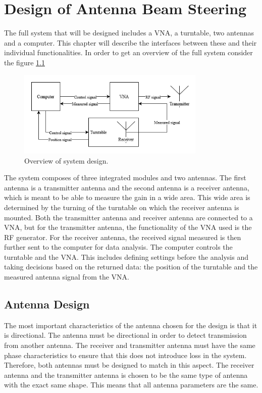 \chapter{Design of Antenna Beam Steering} \label{ch:design}
The full system that will be designed includes a VNA, a turntable, two antennas and a computer. This chapter will describe the interfaces between these and their individual functionalities. In order to get an overview of the full system consider the figure \ref{fig:system_design}
\begin{figure}[H]
    \centering
    \includegraphics[width=0.8\textwidth]{figures/system_design.png}
    \caption{Overview of system design.} \label{fig:system_design}
\end{figure}
The system composes of three integrated modules and two antennas. The first antenna is a transmitter antenna and the second antenna is a receiver antenna, which is meant to be able to measure the gain in a wide area. This wide area is determined by the turning of the turntable on which the receiver antenna is mounted. Both the transmitter antenna and receiver antenna are connected to a VNA, but for the transmitter antenna, the functionality of the VNA used is the RF generator. For the receiver antenna, the received signal measured is then further sent to the computer for data analysis. The computer controls the turntable and the VNA. This includes defining settings before the analysis and taking decisions based on the returned data: the position of the turntable and the measured antenna signal from the VNA. 


\section{Antenna Design}
The most important characteristics of the antenna chosen for the design is that it is directional. The antenna must be directional in order to detect transmission from another antenna. The receiver and transmitter antenna must have the same phase characteristics to ensure that this does not introduce loss in the system. Therefore, both antennas must be designed to match in this aspect. The receiver antenna and the transmitter antenna is chosen to be the same type of antenna with the exact same shape. This means that all antenna parameters are the same. 

